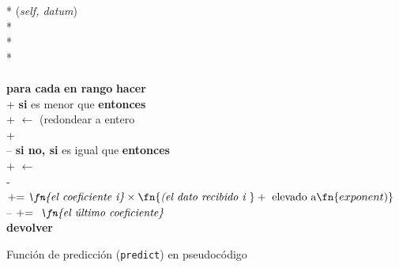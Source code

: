 \documentclass[conference,a4paper]{IEEEtran}
\begin{document}
\begin{figure}[h]
  \centering
  \begin{pseudo}*
    (\textit{self, datum}) \\*
     \\*
     \\*
     \\
     \\
    \textbf{para cada}  \textbf{en rango}  \textbf{hacer} \\+
    \textbf{si}  es menor que 
    \textbf{entonces} \\+
     \(\leftarrow\) 
    (redondear a entero \\+
     \\--
    \textbf{si no, si}  es igual que  \textbf{entonces} \\+
    \textit{} \(\leftarrow\)  \\-
     \\
     \(\mathrel{+}= \textit{\fn{el coeficiente i}} \times \fn{\textit{(el dato recibido i }} \\+
    \text{ elevado a} \fn{exponent)}\) \\--
     \(\mathrel{+}= \textit{ \fn{el último coeficiente}}\) \\
    \textbf{devolver} 
  \end{pseudo}
  \caption{Función de predicción (\texttt{predict}) en pseudocódigo}
  \label{pcd:predict}
\end{figure}
\end{document}
